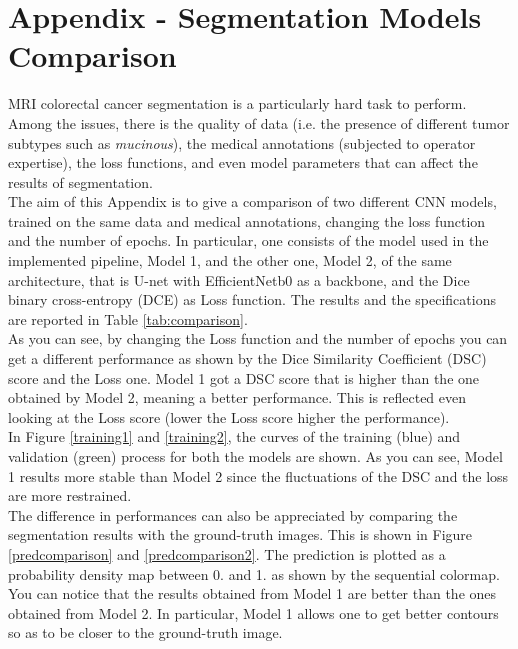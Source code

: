 \documentclass{standalone}
\begin{document}
\chapter*{Appendix - Segmentation Models Comparison}

MRI colorectal cancer segmentation is a particularly hard task to perform.
Among the issues, there is the quality of data (i.e. the presence of different tumor subtypes such as \textit{mucinous}), the medical annotations (subjected to operator expertise), the loss functions, and even model parameters that can affect the results of segmentation.\\
The aim of this Appendix is to give a comparison of two different CNN models, trained on the same data and medical annotations, changing the loss function and the number of epochs.
In particular, one consists of the model used in the implemented pipeline, Model 1, and the other one, Model 2, of the same architecture, that is U-net with EfficientNetb0 as a backbone, and the Dice binary cross-entropy (DCE) as Loss function.
The results and the specifications are reported in Table \ref{tab:comparison}.
\\
As you can see, by changing the Loss function and the number of epochs you can get a different performance as shown by the Dice Similarity Coefficient (DSC) score and the Loss one.
Model 1 got a DSC score that is higher than the one obtained by Model 2, meaning a better performance.
This is reflected even looking at the Loss score (lower the Loss score higher the performance).
\\
In Figure \ref{training1} and \ref{training2}, the curves of the training (blue) and validation (green) process for both the models are shown.
As you can see, Model 1 results more stable than Model 2 since the fluctuations of the DSC and the loss are more restrained.
\\
The difference in performances can also be appreciated by comparing the segmentation results with the ground-truth images.
This is shown in Figure \ref{predcomparison} and \ref{predcomparison2}.
The prediction is plotted as a probability density map between 0. and 1. as shown by the sequential colormap.
\\
You can notice that the results obtained from Model 1 are better than the ones obtained from Model 2.
In particular, Model 1 allows one to get better contours so as to be closer to the ground-truth image.
\end{document}
